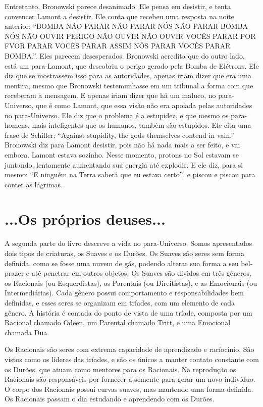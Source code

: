 \documentclass[14pt,portuguese]{extreport}
\begin{document}
    	  Entretanto, Bronowski parece desanimado. Ele pensa em desistir, e tenta convencer Lamont a desistir. Ele conta que recebeu uma resposta na noite anterior: “BOMBA NÃO PARAR NÃO PARAR NÓS NÃO PARAR BOMBA NÓS NÃO OUVIR PERIGO NÃO OUVIR NÃO OUVIR VOCÊS PARAR POR FVOR PARAR VOCÊS PARAR ASSIM NÓS PARAR VOCÊS PARAR BOMBA.”. Eles parecem desesperados. Bronowski acredita que do outro lado, está um para-Lamont, que descobriu o perigo gerado pela Bomba de Elétrons. Ele diz que se mostrassem isso para as autoridades, apenas iriam dizer que era uma mentira, mesmo que Bronowski testemunhasse em um tribunal a forma com que receberam a mensagem. E apenas iriam dizer que há um maluco, no para-Universo, que é como Lamont, que essa visão não era apoiada pelas autoridades no para-Universo. Ele diz que o problema é a estupidez, e que mesmo os para-homens, mais inteligentes que os humanos, também são estupidos. Ele cita uma frase de Schiller: “Against stupidity, the gods themselves contend in vain.” Bronowski diz para Lamont desistir, pois não há nada mais a ser feito, e vai embora. Lamont estava sozinho. Nesse momento, protons no Sol estavam se juntando, lentamente aumentando sua energia até explodir. E ele diz, para si mesmo: “E ninguém na Terra saberá que eu estava certo”, e piscou e piscou para conter as lágrimas.

    \section{...Os próprios deuses...}

      A segunda parte do livro descreve a vida no para-Universo. Somos apresentados
      dois tipos de criaturas, os Suaves e os Durões. Os Suaves são seres sem forma definida,
      como se fosse uma nuvem de gás, podendo alterar sua forma a seu bel-prazer e até penetrar em outros objetos. 
      Os Suaves são dividos em três gêneros, os Racionais (ou Esquerdistas), os Parentais (ou Direitistas), 
      e as Emocionais (ou Intermediárias). Cada gênero possui comportamento e responsabilidades
      bem definidas, e esses seres se organizam em tríades, com um elemento de cada gênero. A história
      é contada do ponto de vista de uma tríade, composta por um Racional chamado Odeen, um Parental chamado Tritt,
      e uma Emocional chamada Dua.
      
      Os Racionais são seres com extrema capacidade de aprendizado e racíocinio. São vistos como os líderes das tríades,
      e são os únicos a manter contato constante com os Durões, que atuam como mentores para os Racionais. Na reprodução 
      os Racionais são responsáveis por fornecer a semente para gerar um novo indivíduo. O corpo dos Racionais possui curvas
      suaves, mas mantendo uma forma definida. Os Racionais passam o dia estudando e aprendendo com os Durões.
      
\end{document}
